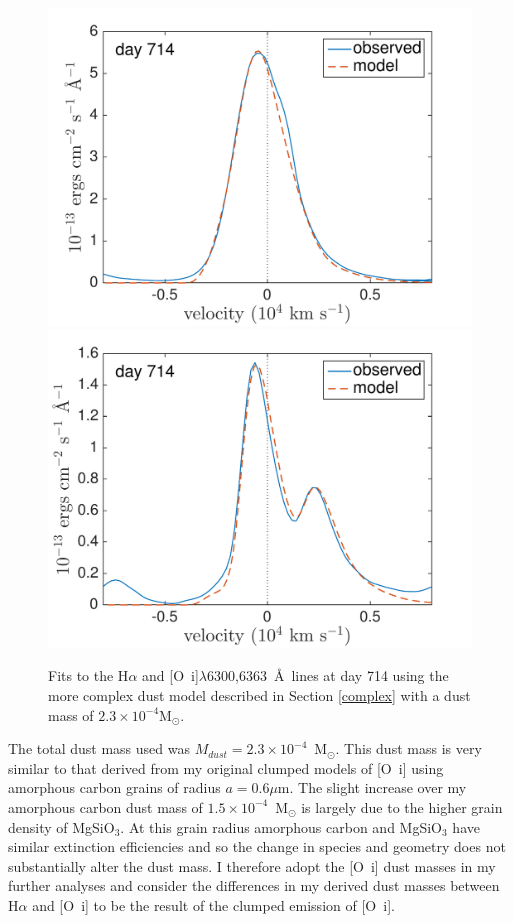 \begin{figure}
\centering
\includegraphics[scale=0.39,clip=true,trim=0 0 40 20]{chapters/chapter5/images/HaOImod_Ha.pdf}
\includegraphics[scale=0.39, clip=true,trim=0 0 40 20]{chapters/chapter5/images/HaOImod_OI.pdf}
\caption{Fits to the H$\alpha$ and [O~{\sc i}]$\lambda$6300,6363~\AA\ lines at day 714 using the more complex dust model described in Section \ref{complex} with a dust mass of  $2.3 \times 10^{-4}$M$_{\odot}$.}
\label{HaOImod}
\end{figure}

The total dust mass used was $M_{dust}=2.3 \times 10^{-4}$~M$_{\odot}$.  This dust mass is very similar to that derived from my original clumped models of [O~{\sc i}] using amorphous carbon grains of radius $a=0.6\mu$m.  The slight increase over my amorphous carbon dust mass of $1.5 \times 10^{-4}$~M$_{\odot}$ is largely due to the higher grain density of MgSiO$_3$.  At this grain radius amorphous carbon and MgSiO$_3$ have similar extinction efficiencies and so the change in species and geometry does not substantially alter the dust mass. I therefore adopt the [O~{\sc i}] dust masses in my further analyses and consider the differences in my derived dust masses between H$\alpha$ and [O~{\sc i}] to be the result of the clumped emission of [O~{\sc i}].


